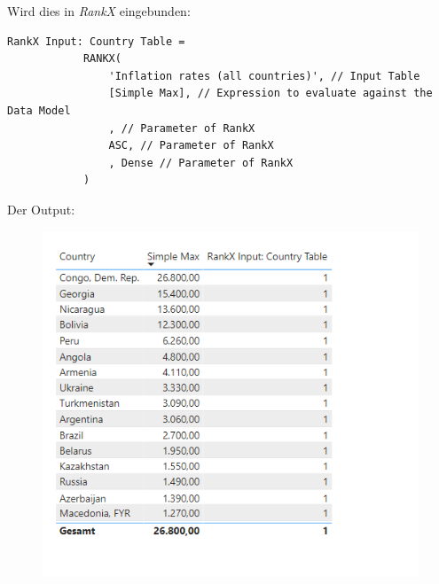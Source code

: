 Wird dies in \textit{RankX} eingebunden:
\begin{lstlisting}[style=DAX]
RankX Input: Country Table = 
			RANKX(
				'Inflation rates (all countries)', // Input Table
				[Simple Max], // Expression to evaluate against the Data Model
				, // Parameter of RankX
				ASC, // Parameter of RankX
				, Dense // Parameter of RankX
			)
\end{lstlisting}
Der Output:
\begin{figure}[H]
	\centering
	\includegraphics[scale = 0.3]{attachment/chapter_1/Scc149}
\end{figure}

